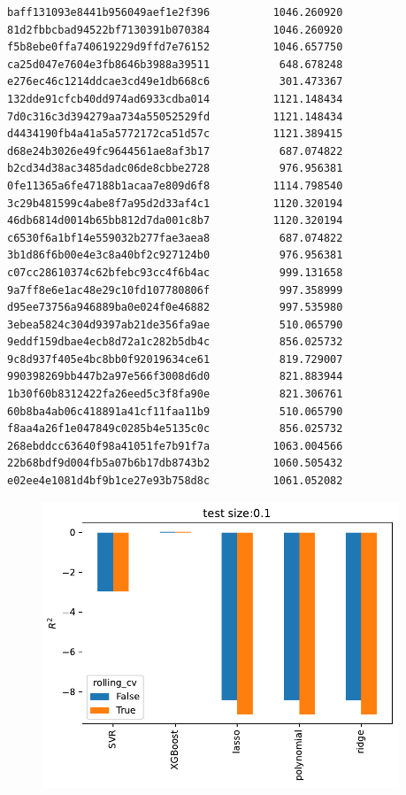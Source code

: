 \begin{verbatim}
baff131093e8441b956049aef1e2f396          1046.260920
81d2fbbcbad94522bf7130391b070384          1046.260920
f5b8ebe0ffa740619229d9ffd7e76152          1046.657750
ca25d047e7604e3fb8646b3988a39511           648.678248
e276ec46c1214ddcae3cd49e1db668c6           301.473367
132dde91cfcb40dd974ad6933cdba014          1121.148434
7d0c316c3d394279aa734a55052529fd          1121.148434
d4434190fb4a41a5a5772172ca51d57c          1121.389415
d68e24b3026e49fc9644561ae8af3b17           687.074822
b2cd34d38ac3485dadc06de8cbbe2728           976.956381
0fe11365a6fe47188b1acaa7e809d6f8          1114.798540
3c29b481599c4abe8f7a95d2d33af4c1          1120.320194
46db6814d0014b65bb812d7da001c8b7          1120.320194
c6530f6a1bf14e559032b277fae3aea8           687.074822
3b1d86f6b00e4e3c8a40bf2c927124b0           976.956381
c07cc28610374c62bfebc93cc4f6b4ac           999.131658
9a7ff8e6e1ac48e29c10fd107780806f           997.358999
d95ee73756a946889ba0e024f0e46882           997.535980
3ebea5824c304d9397ab21de356fa9ae           510.065790
9eddf159dbae4ecb8d72a1c282b5db4c           856.025732
9c8d937f405e4bc8bb0f92019634ce61           819.729007
990398269bb447b2a97e566f3008d6d0           821.883944
1b30f60b8312422fa26eed5c3f8fa90e           821.306761
60b8ba4ab06c418891a41cf11faa11b9           510.065790
f8aa4a26f1e047849c0285b4e5135c0c           856.025732
268ebddcc63640f98a41051fe7b91f7a          1063.004566
22b68bdf9d004fb5a07b6b17db8743b2          1060.505432
e02ee4e1081d4bf9b1ce27e93b758d8c          1061.052082
\end{verbatim}
\begin{figure}[H]
\begin{center}\includegraphics[width = 0.95\textwidth]{figures/output_43_0.pdf}\end{center}
\vspace{-0.7cm}
\caption{}
\label{fig:}
\end{figure}
